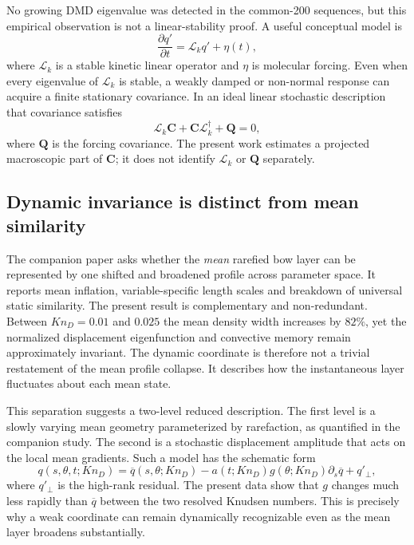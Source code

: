 \documentclass[paper]{JFM-FLM_Au}
\newcommand{\KnD}{Kn_D}
\newcommand{\mean}[1]{\overline{#1}}
\begin{document}
No growing DMD eigenvalue was detected in the common-200 sequences, but this empirical observation is not a linear-stability proof. A useful conceptual model is
\begin{equation}
 \frac{\partial q'}{\partial t}=\mathcal L_k q'+\eta(t),
 \label{eq:stochastic_operator}
\end{equation}
where $\mathcal L_k$ is a stable kinetic linear operator and $\eta$ is molecular forcing. Even when every eigenvalue of $\mathcal L_k$ is stable, a weakly damped or non-normal response can acquire a finite stationary covariance. In an ideal linear stochastic description that covariance satisfies
\begin{equation}
 \mathcal L_k\bm C+\bm C\mathcal L_k^\dagger+\bm Q=0,
 \label{eq:lyap}
\end{equation}
where $\bm Q$ is the forcing covariance. The present work estimates a projected macroscopic part of $\bm C$; it does not identify $\mathcal L_k$ or $\bm Q$ separately.

\subsection{Dynamic invariance is distinct from mean similarity}
The companion paper \citep{RoohiShoja2026Mean} asks whether the \emph{mean} rarefied bow layer can be represented by one shifted and broadened profile across parameter space. It reports mean inflation, variable-specific length scales and breakdown of universal static similarity. The present result is complementary and non-redundant. Between $\KnD=0.01$ and $0.025$ the mean density width increases by $82\%$, yet the normalized displacement eigenfunction and convective memory remain approximately invariant. The dynamic coordinate is therefore not a trivial restatement of the mean profile collapse. It describes how the instantaneous layer fluctuates about each mean state.

This separation suggests a two-level reduced description. The first level is a slowly varying mean geometry parameterized by rarefaction, as quantified in the companion study. The second is a stochastic displacement amplitude that acts on the local mean gradients. Such a model has the schematic form
\begin{equation}
 q(s,\theta,t;\KnD)
 =\mean q(s,\theta;\KnD)
 -a(t;\KnD)g(\theta;\KnD)\partial_s\mean q
 +q'_\perp,
 \label{eq:twolevel}
\end{equation}
where $q'_\perp$ is the high-rank residual. The present data show that $g$ changes much less rapidly than $\mean q$ between the two resolved Knudsen numbers. This is precisely why a weak coordinate can remain dynamically recognizable even as the mean layer broadens substantially.
\end{document}
